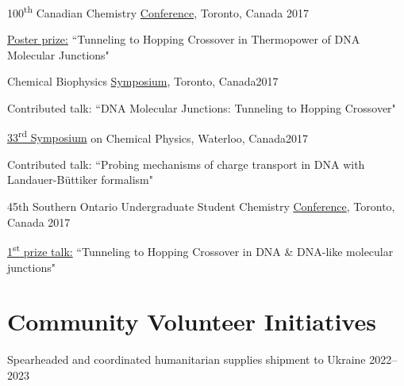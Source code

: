 \documentclass[margin,line]{res}
\newenvironment{list1}{
  \begin{list}{\ding{113}}{%
      \setlength{\itemsep}{0in}
      \setlength{\parsep}{0in} \setlength{\parskip}{0in}
      \setlength{\topsep}{0in} \setlength{\partopsep}{0in} 
      \setlength{\leftmargin}{0.17in}}}{\end{list}}
\begin{document}
\begin{resume}
\vspace*{-2.5mm}

100\textsuperscript{th} Canadian Chemistry \href{https://www.cheminst.ca/magazine/article/csc-celebrates-100-years-of-chemistry-in-toronto/}{Conference}, Toronto, Canada \hfill {2017}

\begin{list1}
\item[]\underline{Poster prize:} ``Tunneling to Hopping Crossover in Thermopower of DNA Molecular Junctions" 
\end{list1}

Chemical Biophysics \href{www.chembiophys.ca}{Symposium}, Toronto, Canada\hfill{2017}

\begin{list1}
\item[]Contributed talk: ``DNA Molecular Junctions:  Tunneling to Hopping Crossover"
\end{list1}

\vspace*{-2.5mm}

\href{http://scp.uwaterloo.ca}{33\textsuperscript{rd} Symposium} on Chemical Physics, Waterloo, Canada\hfill{2017}

\begin{list1}
\item[]Contributed talk: ``Probing mechanisms of charge transport in DNA with Landauer-B\"uttiker formalism"
\end{list1}

\vspace*{-2.5mm}

45th Southern Ontario Undergraduate Student Chemistry \href{https://sites.google.com/view/souscc52/home}{Conference}, Toronto, Canada \hfill{2017}

\begin{list1}
\item[]\underline{1\textsuperscript{st} prize talk:}  ``Tunneling to Hopping Crossover in DNA \& DNA-like molecular junctions"
\end{list1}

\section{\sc Community Volunteer Initiatives}
Spearheaded and coordinated humanitarian supplies shipment to Ukraine \href{https://www.caltech.edu/about/news/organizing-aid-to-his-native-ukraine}{\faExternalLink}\hfill{2022--2023}


\end{resume}
\end{document}
